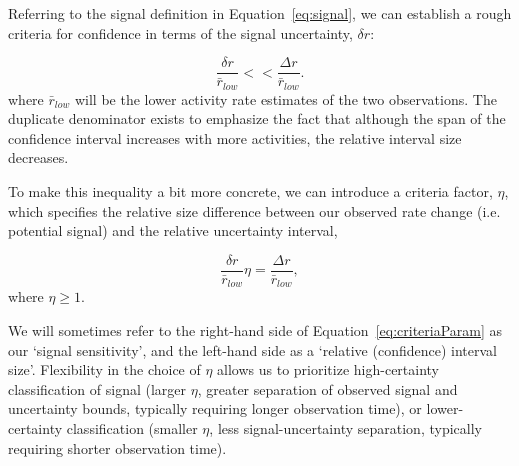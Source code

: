 \documentclass{article}
\begin{document}
Referring to the signal definition in Equation~\ref{eq:signal}, we can establish a rough criteria for 
confidence in terms of the signal uncertainty, $\delta r$:


\begin{equation}
    \label{eq:criteria}
    \frac{\delta r}{\bar{r}_{low}} << \frac{\Delta r}{\bar{r}_{low}}.
\end{equation}
where $\bar{r}_{low}$ will be the lower activity rate estimates of the two observations. The 
duplicate denominator exists to emphasize the fact that although the span of the 
confidence interval increases with more activities, the relative interval size decreases. 

To make this inequality a bit more concrete, we can introduce a criteria factor, $\eta$, which 
specifies the relative size difference between our observed rate change (i.e. potential signal) 
and the relative uncertainty interval,


\begin{equation}
    \label{eq:criteriaParam}
    \frac{\delta r}{\bar{r}_{low}} \eta  = \frac{\Delta r}{\bar{r}_{low}},
\end{equation}
where $\eta \ge 1$.

We will sometimes refer to the right-hand side of Equation~\ref{eq:criteriaParam} as our `signal 
sensitivity', and the left-hand side as a `relative (confidence) interval size'. Flexibility in the 
choice of $\eta$ allows us to prioritize high-certainty classification of signal 
(larger $\eta$, greater separation of observed signal and uncertainty bounds, 
typically requiring longer observation time), or lower-certainty classification (smaller $\eta$, 
less signal-uncertainty separation, typically requiring shorter observation time).
\end{document}
